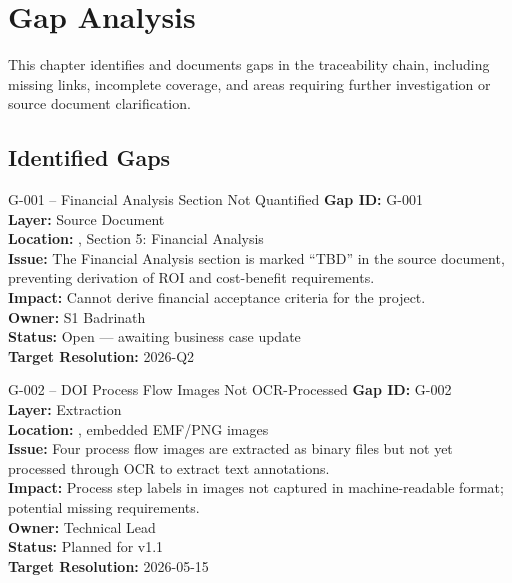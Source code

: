\chapter{Gap Analysis}
\label{ch:gap-analysis}

This chapter identifies and documents gaps in the traceability chain,
including missing links, incomplete coverage, and areas requiring
further investigation or source document clarification.

\section{Identified Gaps}
\label{sec:identified-gaps}

\begin{gapbox}{G-001 -- Financial Analysis Section Not Quantified}
\textbf{Gap ID:} G-001 \\
\textbf{Layer:} Source Document \\
\textbf{Location:} , Section 5: Financial Analysis \\
\textbf{Issue:} The Financial Analysis section is marked ``TBD'' in the
source document, preventing derivation of ROI and cost-benefit requirements. \\
\textbf{Impact:} Cannot derive financial acceptance criteria for the project. \\
\textbf{Owner:} S1 Badrinath \\
\textbf{Status:} Open --- awaiting business case update \\
\textbf{Target Resolution:} 2026-Q2
\end{gapbox}

\begin{gapbox}{G-002 -- DOI Process Flow Images Not OCR-Processed}
\textbf{Gap ID:} G-002 \\
\textbf{Layer:} Extraction \\
\textbf{Location:} , embedded EMF/PNG images \\
\textbf{Issue:} Four process flow images are extracted as binary files but
not yet processed through OCR to extract text annotations. \\
\textbf{Impact:} Process step labels in images not captured in machine-readable
format; potential missing requirements. \\
\textbf{Owner:} Technical Lead \\
\textbf{Status:} Planned for v1.1 \\
\textbf{Target Resolution:} 2026-05-15
\end{gapbox}

